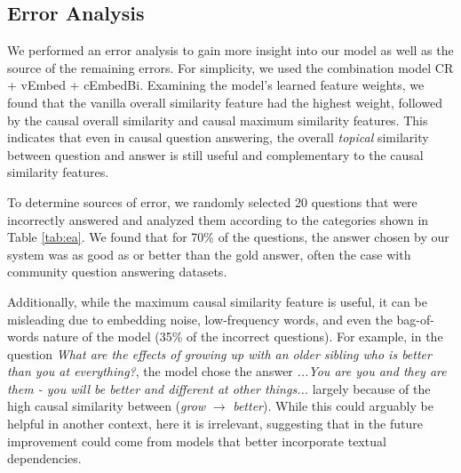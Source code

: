 \subsection{Error Analysis}
\label{sec-emnlp2016:erroranalysis}

We performed an error analysis to gain more insight into our model as well as the source of the remaining errors.  For simplicity, we used the combination model CR + vEmbed + cEmbedBi. Examining the model's learned feature weights, we found that the vanilla overall similarity feature had the highest weight, followed by the causal overall similarity and causal maximum similarity features.  This indicates that even in causal question answering, the overall \emph{topical} similarity between question and answer is still useful and complementary to the causal similarity features.


To determine sources of error, we randomly selected 20 questions that were incorrectly answered and analyzed them according to the categories shown in Table \ref{tab:ea}.  We found that for 70\% of the questions, the answer chosen by our system was as good as or better than the gold answer, often the case with community question answering datasets.


Additionally, while the maximum causal similarity feature is useful, it can be misleading due to embedding noise, low-frequency words, and even the bag-of-words nature of the model (35\% of the incorrect questions).  For example, in the question \emph{What are the effects of growing up with an older sibling who is better than you at everything?}, the model chose the answer \emph{...You are you and they are them - you will be better and different at other things...}  largely because of the high causal similarity between (\emph{grow} $\rightarrow$ \emph{better}).  While this could arguably be helpful in another context, here it is irrelevant, suggesting that in the future improvement could come from models that better incorporate textual dependencies.





